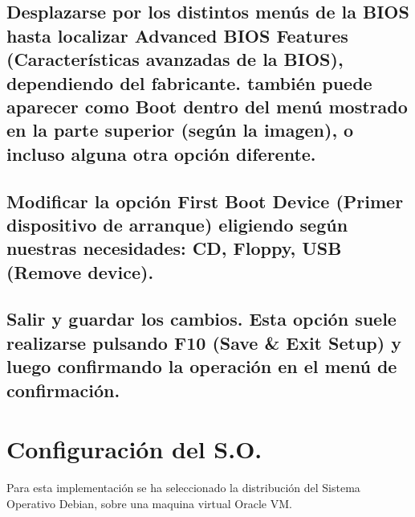 \documentclass[10pt,letterpaper,spanish,numbers=endperiod]{article}
\begin{document}
\subsection{Desplazarse por los distintos men\'us de la BIOS hasta localizar Advanced BIOS Features (Caracter\'isticas avanzadas de la BIOS), dependiendo del fabricante. tambi\'en puede aparecer como Boot dentro del men\'u mostrado en la parte superior (seg\'un la imagen), o incluso alguna otra opci\'on diferente.} \label{sec:uno_tres}
\subsection{Modificar la opci\'on First Boot Device (Primer dispositivo de arranque) eligiendo seg\'un nuestras necesidades: CD, Floppy, USB (Remove device).} \label{sec:uno_cuatro}
\subsection{Salir y guardar los cambios. Esta opci\'on suele realizarse pulsando F10 (Save & Exit Setup) y luego confirmando la operaci\'on en el men\'u de confirmaci\'on.} \label{sec:uno_cinco}

\nuevaPagina

\section{Configuraci\'on del S.O.} \label{sec:dos}
Para esta implementaci\'on se ha seleccionado la distribuci\'on del Sistema Operativo Debian, sobre una maquina virtual Oracle VM.
\end{document}
